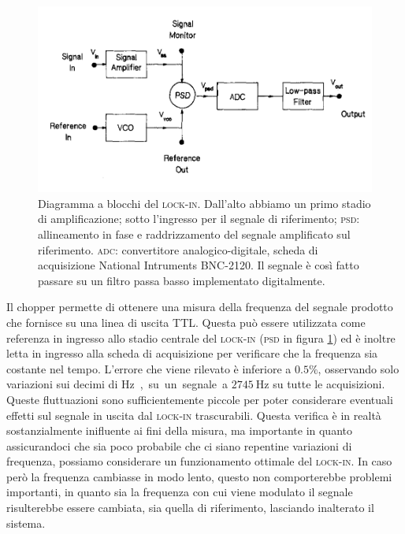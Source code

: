 \documentclass[
    prb,altaffilletter,citeautoscript,
    amsmath,amssymb,
    showpacs,showkeys,floatfix,
    reprint
]{revtex4-1}
\begin{document}
\begin{figure}
    \centering
    \includegraphics[width=\linewidth]{figures/block_diagram.png}
    \caption{Diagramma a blocchi del \textsc{lock-in}. Dall'alto abbiamo un primo stadio di amplificazione; sotto l'ingresso per il segnale di riferimento; \textsc{psd}: allineamento in fase e raddrizzamento del segnale amplificato sul riferimento. \textsc{adc}: convertitore analogico-digitale, scheda di acquisizione National Intruments BNC-2120. Il segnale è così fatto passare su un filtro passa basso implementato digitalmente. }
    \label{fig:lock-in/block_diagram}
\end{figure}

Il chopper permette di ottenere una misura della frequenza del segnale prodotto che fornisce su una linea di uscita TTL. Questa può essere utilizzata come referenza in ingresso allo stadio centrale del \textsc{lock-in} (\textsc{psd} in figura \ref{fig:lock-in/block_diagram}) ed è inoltre letta in ingresso alla scheda di acquisizione per verificare che la frequenza sia costante nel tempo. L'errore che viene rilevato è inferiore a $0.5\%$, osservando solo variazioni sui decimi di \si\hertz, su un segnale a $\SI{2745}\hertz$ su tutte le acquisizioni. Queste fluttuazioni sono sufficientemente piccole per poter considerare eventuali effetti sul segnale in uscita dal \textsc{lock-in} trascurabili. Questa verifica è in realtà sostanzialmente inifluente ai fini della misura, ma importante in quanto assicurandoci che sia poco probabile che ci siano repentine variazioni di frequenza, possiamo considerare un funzionamento ottimale del \textsc{lock-in}. In caso però la frequenza cambiasse in modo lento, questo non comporterebbe problemi importanti, in quanto sia la frequenza con cui viene modulato il segnale risulterebbe essere cambiata, sia quella di riferimento, lasciando inalterato il sistema. 
\end{document}

